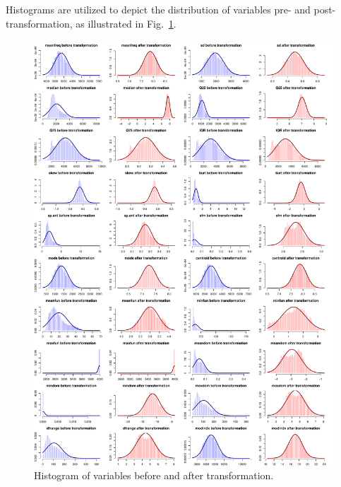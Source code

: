 \documentclass{article}
\begin{document}
	Histograms are utilized to depict the distribution of variables pre- and post-transformation, as illustrated in Fig.~\ref{transformation_hist}.
	\begin{figure}
		\centering
		\includegraphics[width=\textwidth]{graphs/transformations_hist.pdf}
		\caption{Histogram of variables before and after transformation.}
		\label{transformation_hist}
	\end{figure}
	
\end{document}
